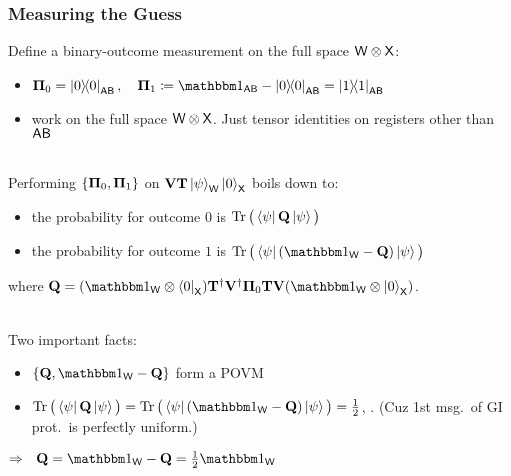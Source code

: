 \documentclass[aspectratio=1610, 12pt, xcolor={dvipsnames}]{beamer}
\begin{document}
\begin{frame}
\frametitle{Measuring the Guess}

Define a binary-outcome measurement on the full space $\reg{w}\tensor\reg{x}$: 
\begin{itemize}
\item $\vb{\Pi}_0 = \ketbra{0}_\reg{ab}, ~~~ \vb{\Pi}_1 \coloneqq \idm_\reg{ab} - \ketbra{0}_\reg{ab} = \ketbra{1}_\reg{ab}$
\item 
work on the full space $\reg{w}\tensor\reg{x}$. Just tensor identities on registers other than $\reg{ab}$
\end{itemize}
~\\


Performing $\{\vb{\Pi}_0, \vb{\Pi}_1\}$ on $\vb{V}\vb{T}\ket{\psi}_\reg{w}\ket{0}_\reg{x}$ boils down to:
\begin{itemize}
\item the probability for outcome $0$ is 
$\Tr\big(\bra{\psi}\vb{Q} \ket{\psi}\big)$
\item the probability for outcome $1$ is 
$\Tr\big(\bra{\psi}( \idm_\reg{w}- \vb{Q} )\ket{\psi}\big)$
\end{itemize}
where $\vb{Q}	 = (\idm_\reg{w} \tensor \bra{0}_\reg{x}) \vb{T}^\dagger \vb{V}^\dagger \vb{\Pi}_0 \vb{T} \vb{V} (\idm_\reg{w} \tensor \ket{0}_\reg{x})$.
\\~

Two important facts:
\begin{itemize}
\item $\Set{\vb{Q}, \idm_\reg{w}- \vb{Q}}$ form a POVM
\item
$\Tr\big(\bra{\psi}\vb{Q} \ket{\psi}\big) = \Tr\big(\bra{\psi}( \idm_\reg{w}- \vb{Q} )\ket{\psi}\big) = \frac{1}{2}$, . (Cuz 1st msg.\ of GI prot.\ is perfectly uniform.)
\end{itemize}
$\Rightarrow ~~ \vb{Q}  = \idm_\reg{w}- \vb{Q} = \frac{1}{2}\idm_\reg{w}$
\end{frame}
\end{document}
